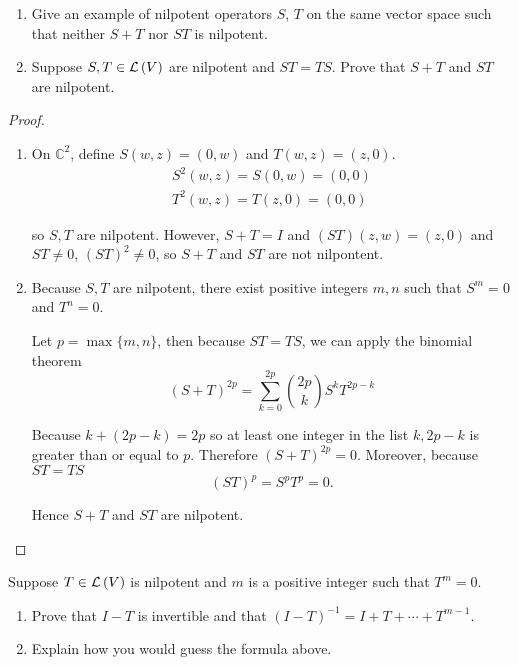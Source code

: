 \begin{exercise}\label{chapter8:sectionA:exercise16}
    \begin{enumerate}[label={(\alph*)}]
        \item Give an example of nilpotent operators $S$, $T$ on the same vector space such that neither $S + T$ nor $ST$ is nilpotent.
        \item Suppose $S, T \in \mathcal{L}\left({V}\right)$ are nilpotent and $ST = TS$. Prove that $S + T$ and $ST$ are nilpotent.
    \end{enumerate}
\end{exercise}

\begin{proof}
    \begin{enumerate}[label={(\alph*)}]
        \item On $\mathbb{C}^{2}$, define $S(w, z) = (0, w)$ and $T(w, z) = (z, 0)$.
              \[
                  \begin{split}
                      S^{2}(w, z) = S(0, w) = (0, 0) \\
                      T^{2}(w, z) = T(z, 0) = (0, 0)
                  \end{split}
              \]

              so $S, T$ are nilpotent. However, $S + T = I$ and $(ST)(z, w) = (z, 0)$ and ${ST}\ne 0$, ${(ST)}^{2}\ne 0$, so $S + T$ and $ST$ are not nilpontent.
        \item Because $S, T$ are nilpotent, there exist positive integers $m, n$ such that $S^{m} = 0$ and $T^{n} = 0$.

              Let $p = \max\{ m, n \}$, then because $ST = TS$, we can apply the binomial theorem
              \[
                  {(S + T)}^{2p} = \sum^{2p}_{k=0}\binom{2p}{k}S^{k}T^{2p-k}
              \]

              Because $k + (2p - k) = 2p$ so at least one integer in the list $k, 2p - k$ is greater than or equal to $p$. Therefore ${(S + T)}^{2p} = 0$. Moreover, because $ST = TS$
              \[
                  {(ST)}^{p} = S^{p}T^{p} = 0.
              \]

              Hence $S + T$ and $ST$ are nilpotent.
    \end{enumerate}
\end{proof}
\newpage

\begin{exercise}\label{chapter8:sectionA:exercise17}
    Suppose $T\in \mathcal{L}\left({V}\right)$ is nilpotent and $m$ is a positive integer such that $T^{m} = 0$.
    \begin{enumerate}[label={(\alph*)}]
        \item Prove that $I - T$ is invertible and that ${(I - T)}^{-1} = I + T + \cdots + T^{m-1}$.
        \item Explain how you would guess the formula above.
    \end{enumerate}
\end{exercise}

